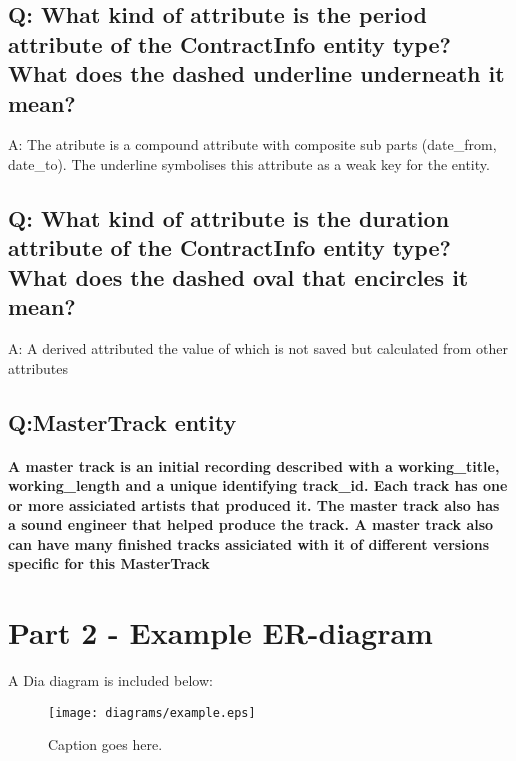 \documentclass[11pt,a4paper]{article}
\begin{document}
\subsection{Q: What kind of attribute is the period attribute of the ContractInfo entity 
type? What does the dashed underline underneath it mean?}

A: The atribute is a compound attribute with composite sub parts (date\_from,
 date\_to). The underline symbolises this attribute as a weak key for the 
entity. 


\subsection{Q: What kind of attribute is the duration attribute of the ContractInfo 
entity type? What does the dashed oval that encircles it mean?}

A: A derived attributed the value of which is not saved but calculated from
other attributes


\subsection{Q:MasterTrack entity}

\paragraph{
A master track is an initial recording described with a working\_title,
 working\_length and a unique identifying track\_id.
Each track has one or more assiciated artists that produced it.
The master track also has a sound engineer that helped produce the track.
A master track also can have many finished tracks assiciated with it of
 different versions specific for this MasterTrack
}

\section{Part 2 - Example ER-diagram}

A Dia diagram is included below:

\begin{figure}[!htbp]      
   	\centering
	\centerline{\texttt{[image: diagrams/example.eps]}}
	\caption{Caption goes here.}
	\label{fig:test-figure}
\end{figure}
\end{document}

